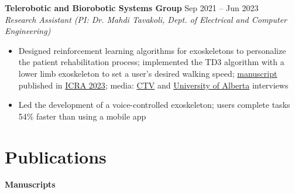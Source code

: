 \documentclass{article}
\begin{document}
\textbf{Telerobotic and Biorobotic Systems Group} \hfill Sep 2021 -- Jun 2023\\
\textit{Research Assistant (PI: Dr. Mahdi Tavakoli, Dept. of Electrical and Computer Engineering)}
\begin{itemize}
    \item Designed reinforcement learning algorithms for exoskeletons to personalize the patient rehabilitation process; implemented the TD3 algorithm with a lower limb exoskeleton to set a user's desired walking speed; \href{https://ieeexplore.ieee.org/abstract/document/10161559/}{manuscript} published in \href{https://www.icra2023.org/}{ICRA 2023}; media: \href{https://edmonton.ctvnews.ca/u-of-a-integrating-artificial-intelligence-into-exoskeleton-technology-1.6019787}{CTV} and \href{https://www.linkedin.com/posts/university-of-alberta_ai-voice-controlled-exoskeleton-activity-6954902847477997568-CTf4?utm_source=linkedin_share&utm_medium=member_desktop_web}{University of Alberta} interviews
    \item Led the development of a voice-controlled exoskeleton; users complete tasks 54\% faster than using a mobile app
\end{itemize}


\section*{\textcolor{my_colour}{Publications}}
\vspace{-.25em} \hrulefill \vspace{.25em}

\textbf{Manuscripts} \vspace{.5em}
\end{document}
